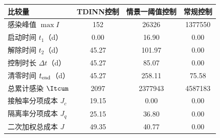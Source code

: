 \begin{tabular*}{\textwidth}{@{\extracolsep{\fill}}l*{3}{S[table-format=7.2]}@{}}
\toprule
比较量 & {TDINN控制} & {情景一阈值控制} & {常规控制} \\
\midrule
感染峰值 $\max I$ & 152 & 26326 & 1377550 \\
启动时间 $t_1$（d） & 0.00 & 16.90 & 0.00 \\
解除时间 $t_2$（d） & 45.27 & 101.97 & 0.00 \\
控制时长 $\Delta t$（d） & 45.27 & 85.07 & 0.00 \\
清零时间 $t_{\rm end}$（d） & 45.27 & 258.11 & 75.58 \\
总累计感染 $\Itcum$ & 2097 & 2377943 & 4587183 \\
\addlinespace[3pt]
接触率分项成本 $J_c$ & 19.15 & 0.00 & 0.00 \\
隔离率分项成本 $J_q$ & 25.15 & 36.80 & 0.00 \\
二次加权总成本 $J$ & 49.35 & 40.77 & 0.00 \\
\bottomrule
\end{tabular*}
